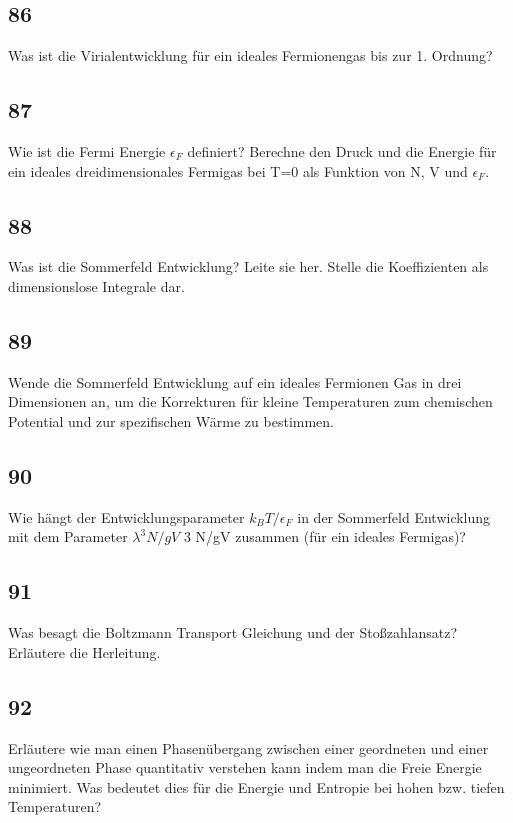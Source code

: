 \documentclass[12pt,a4paper]{report}
\newenvironment{myfrag}{\begin{it}}{\end{it}\vspace{3mm}\par}
\numberwithin{equation}{section}
\begin{document}
\subsection{86}
\begin{myfrag}
Was ist die Virialentwicklung für ein ideales Fermionengas bis zur 1.
Ordnung?
\end{myfrag}
\subsection{87}
\begin{myfrag}
Wie ist die Fermi Energie $\epsilon _F$ definiert? Berechne den Druck und die Energie
für ein ideales dreidimensionales Fermigas bei T=0 als Funktion von N, V
und $\epsilon _F$.
\end{myfrag}
\subsection{88}
\begin{myfrag}
Was ist die Sommerfeld Entwicklung? Leite sie her. Stelle die Koeffizienten als
dimensionslose Integrale dar.
\end{myfrag}
\subsection{89}
\begin{myfrag}
Wende die Sommerfeld Entwicklung auf ein ideales Fermionen Gas in drei Dimensionen
an, um die Korrekturen für kleine Temperaturen zum chemischen Potential und zur
spezifischen Wärme zu bestimmen.
\end{myfrag}
\subsection{90}
\begin{myfrag}
Wie hängt der Entwicklungsparameter $k_B T/\epsilon_F$ in der Sommerfeld Entwicklung mit dem
Parameter $\lambda^3 N/gV$ 3 N/gV zusammen (für ein ideales Fermigas)?
\end{myfrag}
\subsection{91}
\begin{myfrag}
Was besagt die Boltzmann Transport Gleichung und der Stoßzahlansatz? Erläutere die
Herleitung.
\end{myfrag}
\subsection{92}
\begin{myfrag}
Erläutere wie man einen Phasenübergang zwischen einer geordneten und einer
ungeordneten Phase quantitativ verstehen kann indem man die Freie Energie minimiert.
Was bedeutet dies für die Energie und Entropie bei hohen bzw. tiefen Temperaturen?
\end{myfrag}
\end{document}
